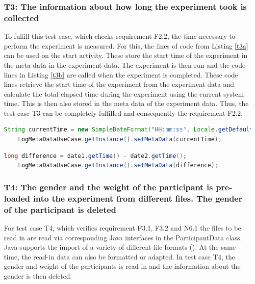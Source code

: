 \newpage

\subsubsection*{T3: The information about how long the experiment took is collected}

To fulfill this test case, which checks requirement F2.2, the time necessary to perform the experiment is measured. For this, the lines of code from Listing \ref{t3a} can be used on the start activity. These store the start time of the experiment in the meta data in the experiment data. The experiment is then run and the code lines in Listing \ref{t3b} are called when the experiment is completed. These code lines retrieve the start time of the experiment from the experiment data and calculate the total elapsed time during the experiment using the current system time. This is then also stored in the meta data of the experiment data. Thus, the test case T3 can be completely fulfilled and consequently the requirement F2.2.

\vspace{0.5cm}

\begin{lstlisting}[language=java,label=t3a,lineskip={0pt}, caption=T3: Collecting the Time Needed to Conduct an Experiment (a), basicstyle=\scriptsize, captionpos=b]
    String currentTime = new SimpleDateFormat("HH:mm:ss", Locale.getDefault()).format(new Date());
    LogMetaDataUseCase.getInstance().setMetaData(currentTime);
\end{lstlisting}

\begin{lstlisting}[language=java,label=t3b,lineskip={0pt}, caption=T3: Collecting the Time Needed to Conduct an Experiment (b), basicstyle=\scriptsize, captionpos=b]
    long difference = date1.getTime() - date2.getTime();
    LogMetaDataUseCase.getInstance().setMetaData(difference);
\end{lstlisting}

\newpage

\subsubsection*{T4: The gender and the weight of the participant is pre-loaded into the experiment from different files. The gender of the participant is deleted}

For test case T4, which verifies requirement F3.1, F3.2 and N6.1 the files to be read in are read via corresponding Java interfaces in the ParticipantData class. Java supports the import of a variety of different file formats (\cite{Ullenboom.2017}). At the same time, the read-in data can also be formatted or adapted. In test case T4, the gender and weight of the participants is read in and the information about the gender is then deleted.

